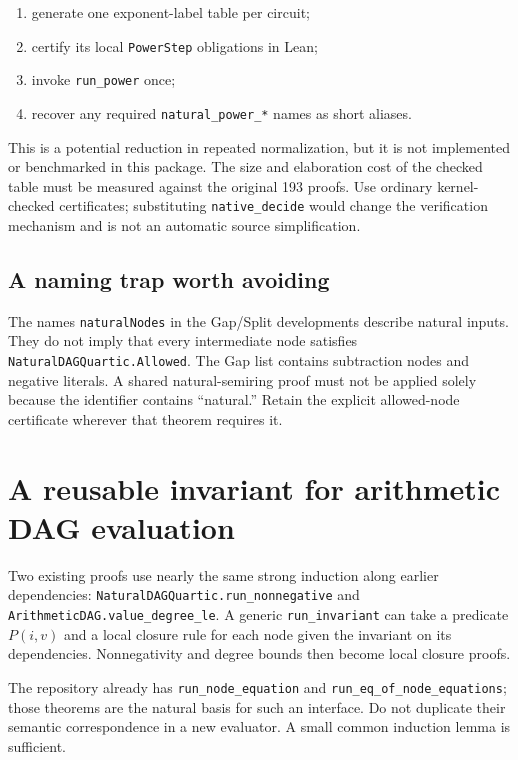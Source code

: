 \documentclass[11pt,letterpaper]{article}
\begin{document}
\begin{enumerate}
\item generate one exponent-label table per circuit;
\item certify its local \texttt{PowerStep} obligations in Lean;
\item invoke \texttt{run\_power} once;
\item recover any required \texttt{natural\_power\_*} names as short aliases.
\end{enumerate}

This is a potential reduction in repeated normalization, but it is not
implemented or benchmarked in this package. The size and elaboration cost
of the checked table must be measured against the original 193 proofs.
Use ordinary kernel-checked certificates; substituting
\texttt{native\_decide} would change the verification mechanism and is not
an automatic source simplification.

\subsection{A naming trap worth avoiding}

The names \texttt{naturalNodes} in the Gap/Split developments describe
natural inputs. They do not imply that every intermediate node satisfies
\texttt{NaturalDAGQuartic.Allowed}. The Gap list contains subtraction nodes
and negative literals. A shared natural-semiring proof must not be applied
solely because the identifier contains ``natural.'' Retain the explicit
allowed-node certificate wherever that theorem requires it.

\section{A reusable invariant for arithmetic DAG evaluation}

Two existing proofs use nearly the same strong induction along earlier
dependencies: \nolinkurl{NaturalDAGQuartic.run_nonnegative} and
\nolinkurl{ArithmeticDAG.value_degree_le}. A generic
\texttt{run\_invariant} can take a predicate $P(i,v)$ and a local closure
rule for each node given the invariant on its dependencies. Nonnegativity
and degree bounds then become local closure proofs.

The repository already has \texttt{run\_node\_equation} and
\texttt{run\_eq\_of\_node\_equations}; those theorems are the natural basis
for such an interface. Do not duplicate their semantic correspondence in
a new evaluator. A small common induction lemma is sufficient.
\end{document}

